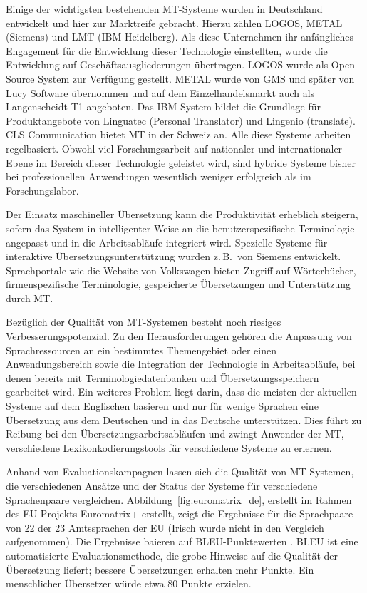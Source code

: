 \documentclass[]{../../metanetpaper}
\begin{document}
\begin{multicols}{2}
Einige der wichtigsten bestehenden MT-Systeme wurden in Deutschland entwickelt und hier zur Marktreife gebracht. Hierzu zählen LOGOS, METAL (Siemens) und LMT (IBM Heidelberg). Als diese Unternehmen ihr anfängliches Engagement für die Entwicklung dieser Technologie einstellten, wurde die Entwicklung auf Geschäftsausgliederungen übertragen. LOGOS wurde als Open-Source System zur Verfügung gestellt. METAL wurde von GMS und später von Lucy Software übernommen und auf dem Einzelhandelsmarkt auch als Langenscheidt T1 angeboten. Das IBM-System bildet die Grundlage für Produktangebote von Linguatec (Personal Translator) und Lingenio (translate). CLS Communication bietet MT in der Schweiz an. Alle diese Systeme arbeiten regelbasiert. Obwohl viel Forschungsarbeit auf nationaler und internationaler Ebene im Bereich dieser Technologie geleistet wird, sind hybride Systeme bisher bei professionellen Anwendungen wesentlich weniger erfolgreich als im Forschungslabor. 

Der Einsatz maschineller Übersetzung kann die Produktivität erheblich steigern, sofern das System in intelligenter Weise an die benutzerspezifische Terminologie angepasst und in die Arbeitsabläufe integriert wird. Spezielle Systeme für interaktive Übersetzungsunterstützung wurden z.\,B.~von Siemens entwickelt. Sprachportale wie die Website von Volkswagen bieten Zugriff auf Wörterbücher, firmenspezifische Terminologie, gespeicherte Übersetzungen und Unterstützung durch MT.

Bezüglich der Qualität von MT-Systemen besteht noch riesiges Verbesserungspotenzial. Zu den Herausforderungen gehören die Anpassung von Sprachressourcen an ein bestimmtes Themengebiet oder einen Anwendungsbereich sowie die Integration der Technologie in Arbeitsabläufe, bei denen bereits mit Terminologiedatenbanken und Übersetzungsspeichern gearbeitet wird. Ein weiteres Problem liegt darin, dass die meisten der aktuellen Systeme auf dem Englischen basieren und nur für wenige Sprachen eine Übersetzung aus dem Deutschen und in das Deutsche unterstützen. Dies führt zu Reibung bei den Übersetzungsarbeitsabläufen und zwingt Anwender der MT, verschiedene Lexikonkodierungstools für verschiedene Systeme zu erlernen.

Anhand von Evaluationskampagnen lassen sich die Qualität von MT-Systemen, die verschiedenen Ansätze und der Status der Systeme für verschiedene Sprachenpaare vergleichen. Abbildung~\ref{fig:euromatrix_de}, erstellt im Rahmen des EU-Projekts Euromatrix+ erstellt, zeigt die Ergebnisse für die Sprachpaare von 22 der 23 Amtssprachen der EU (Irisch wurde nicht in den Vergleich aufgenommen). Die Ergebnisse baieren auf BLEU-Punktewerten \cite{bleu1}. BLEU ist eine automatisierte Evaluationsmethode, die grobe Hinweise auf die Qualität der Übersetzung liefert; bessere Übersetzungen erhalten mehr Punkte. Ein menschlicher Übersetzer würde etwa 80 Punkte erzielen.


\end{multicols}
\end{document}
